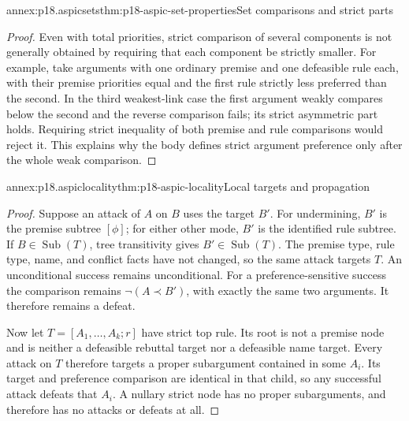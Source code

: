 \begin{annexitem}{annex:p18.aspicsets}{thm:p18-aspic-set-properties}{Set comparisons and strict parts}
\begin{proof}
Even with total priorities, strict comparison of several components is not
generally obtained by requiring that each component be strictly smaller.
For example, take arguments with one ordinary premise and one defeasible
rule each, with their premise priorities equal and the first rule strictly
less preferred than the second. In the third weakest-link case the first
argument weakly compares below the second and the reverse comparison fails;
its strict asymmetric part holds. Requiring strict inequality of both
premise and rule comparisons would reject it. This explains why the body
defines strict argument preference only after the whole weak comparison.
\end{proof}
\end{annexitem}

\begin{annexitem}{annex:p18.aspiclocality}{thm:p18-aspic-locality}{Local targets and propagation}
\begin{proof}
Suppose an attack of \(A\) on \(B\) uses the target \(B'\).
For undermining, \(B'\) is the premise subtree \([\phi]\); for either
other mode, \(B'\) is the identified rule subtree. If
\(B\in\operatorname{Sub}(T)\), tree transitivity gives
\(B'\in\operatorname{Sub}(T)\).
The premise type, rule type, name, and conflict facts have not changed,
so the same attack targets \(T\).
An unconditional success remains unconditional. For a
preference-sensitive success the comparison remains
\(\neg(A\prec B')\), with exactly the same two arguments.
It therefore remains a defeat.

Now let \(T=[A_1,\ldots,A_k;r]\) have strict top rule.
Its root is not a premise node and is neither a defeasible rebuttal target
nor a defeasible name target. Every attack on \(T\) therefore targets a
proper subargument contained in some \(A_i\). Its target and preference
comparison are identical in that child, so any successful attack defeats
that \(A_i\). A nullary strict node has no proper subarguments, and
therefore has no attacks or defeats at all.
\end{proof}
\end{annexitem}

